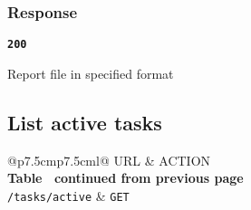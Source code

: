 \subsubsection{Response}

\textbf{\texttt{200}}

Report file in specified format

\subsection{List active tasks}

\begin{longtable}[c]{@{}p{7.5cm}p{7.5cm}l@{}}
  \toprule
  URL                    & ACTION                             \\* \midrule
  \endfirsthead
  \multicolumn{3}{c}%
  {{\bfseries Table \thetable\ continued from previous page}} \\
  \endhead
  \bottomrule
  \endfoot
  \endlastfoot
  \texttt{/tasks/active} & \texttt{GET}                       \\* \bottomrule
  \label{tab:rdf-differ-get-tasks}                            \\
\end{longtable}

